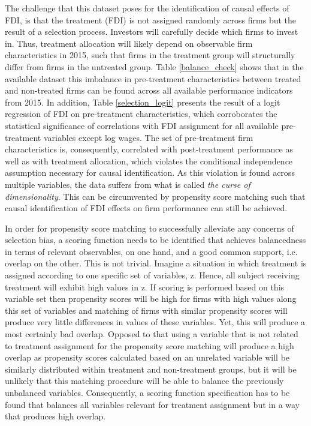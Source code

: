 
The challenge that this dataset poses for the identification of causal effects of FDI, is that the treatment (FDI) is not assigned randomly across firms but the result of a selection process. Investors will carefully decide which firms to invest in. Thus, treatment allocation will likely depend on observable firm characteristics in 2015, such that firms in the treatment group will structurally differ from firms in the untreated group. Table \ref{balance_check} shows that in the available dataset this imbalance in pre-treatment characteristics between treated and non-treated firms can be found across all available performance indicators from 2015. In addition, Table \ref{selection_logit} presents the result of a logit regression of FDI on pre-treatment characteristics, which corroborates the statistical significance of correlations with FDI assignment for all available pre-treatment variables except log wages. The set of pre-treatment firm characteristics is, consequently, correlated with post-treatment performance as well as with treatment allocation, which violates the conditional independence assumption necessary for causal identification. As this violation is found across multiple variables, the data suffers from what is called \textit{the curse of dimensionality}. This can be circumvented by propensity score matching such that causal identification of FDI effects on firm performance can still be achieved.\\ \par 

 


 
 In order for propensity score matching to successfully alleviate any concerns of selection bias, a scoring function needs to be identified that achieves balancedness in terms of relevant observables, on one hand, and a good common support, i.e. overlap on the other. This is not trivial. Imagine a situation in which treatment is assigned according to one specific set of variables, z. Hence, all subject receiving treatment will exhibit high values in z. If scoring is performed based on this variable set then propensity scores will be high for firms with high values along this set of variables and matching of firms with similar propensity scores will produce very little differences in values of these variables. Yet, this will produce a most certainly bad overlap. Opposed to that using a variable that is not related to treatment assignment for the propensity score matching will produce a high overlap as propensity scores calculated based on an unrelated variable will be similarly distributed within treatment and non-treatment groups, but it will be unlikely that this matching procedure will be able to balance the previously unbalanced variables. Consequently, a scoring function specification has to be found that balances all variables relevant for treatment assignment but in a way that produces high overlap. \\ \par 
 

